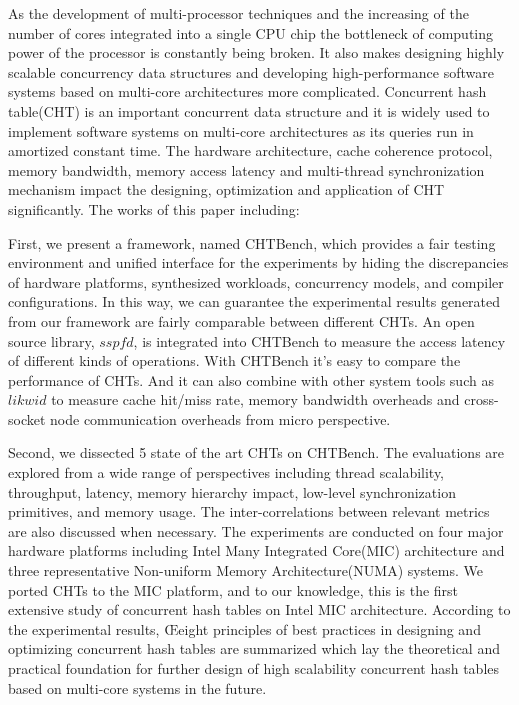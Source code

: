 \begin{abstract}
    
\end{abstract}

\begin{enabstract}
	 As the development of multi-processor techniques and the increasing of the number of cores integrated into a single CPU chip the bottleneck of computing power of the processor is constantly being broken. 
	 It also makes designing highly scalable concurrency data structures and developing high-performance software systems based on multi-core architectures more complicated.
	 Concurrent hash table(CHT) is an important concurrent data structure and it is widely used to implement software systems on multi-core architectures as its queries run in amortized constant time.
	 The hardware architecture, cache coherence protocol, memory bandwidth, memory access latency and multi-thread synchronization mechanism impact the designing, optimization and application of CHT significantly.
     The works of this paper including:

     First, we present a framework, named CHTBench, which provides a fair testing environment and unified interface for the experiments by hiding the discrepancies of hardware platforms, synthesized workloads, concurrency models, and compiler configurations. 
     In this way, we can guarantee the experimental results generated from our framework are fairly comparable between different CHTs. 
     An open source library, $sspfd$, is integrated into CHTBench to measure the access latency of different kinds of operations.
     With CHTBench it's easy to compare the performance of CHTs. And it can also combine with other system tools such as $likwid$ to measure cache hit/miss rate, memory bandwidth overheads and cross-socket node communication overheads from micro perspective.
    
     Second, we dissected 5 state of the art CHTs on CHTBench. The evaluations are explored from a wide range of perspectives including thread scalability, throughput, latency, memory hierarchy impact, low-level synchronization primitives, and memory usage. The inter-correlations between relevant metrics are also discussed when necessary. The experiments are conducted on four major hardware platforms including Intel Many Integrated Core(MIC) architecture and three representative Non-uniform Memory Architecture(NUMA) systems. We ported CHTs to the MIC platform, and to our knowledge, this is the first extensive study of concurrent hash tables on Intel MIC architecture. 
     According to the experimental results, Œeight principles of best practices in designing and optimizing concurrent hash tables are summarized which lay the theoretical and practical foundation for further design of high scalability concurrent hash tables based on multi-core systems in the future. 



\end{enabstract}
